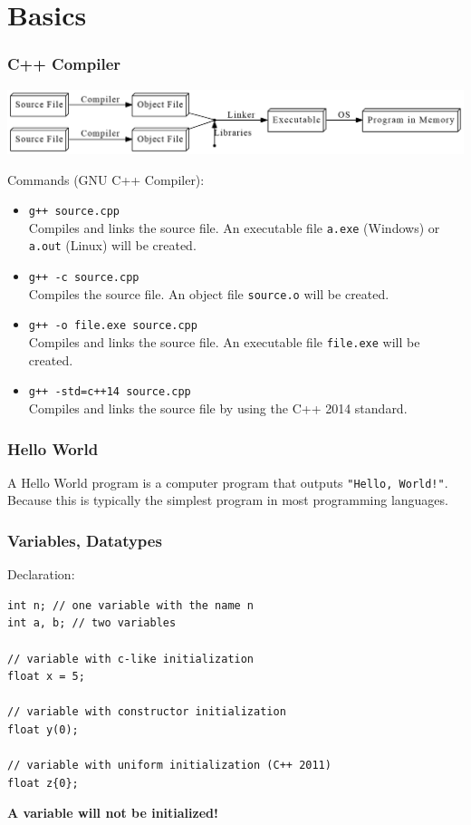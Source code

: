 \section{Basics}

\begin{frame}[fragile]
  \frametitle{C++ Compiler}
  \begin{center}
  \includegraphics[scale=0.35]{img/compiler.png}
  \end{center}
  \vspace{1mm}
  Commands (GNU C++ Compiler):
  \begin{itemize}
  \item \verb|g++ source.cpp|\\
  {\tiny Compiles and links the source file. An executable file \verb|a.exe| (Windows) or \verb|a.out|
  (Linux) will be created.}
  \item \verb|g++ -c source.cpp|\\
  {\tiny Compiles the source file. An object file \verb|source.o| will be created.}
  \item \verb|g++ -o file.exe source.cpp|\\
  {\tiny Compiles and links the source file. An executable file \verb|file.exe| will be created.}
  \item \verb|g++ -std=c++14 source.cpp|\\
  {\tiny Compiles and links the source file by using the C++ 2014 standard.}
  \end{itemize}
\end{frame}

\begin{frame}[fragile]
  \frametitle{Hello World}
  A Hello World program is a computer program that outputs \verb|"Hello, World!"|. Because this is
  typically the simplest program in most programming languages.
  {\tiny
  
  }
\end{frame}

\begin{frame}[fragile]
  \frametitle{Variables, Datatypes}
  Declaration:
  {\small
\begin{lstlisting}
int n; // one variable with the name n
int a, b; // two variables

// variable with c-like initialization
float x = 5;

// variable with constructor initialization
float y(0);

// variable with uniform initialization (C++ 2011)
float z{0};
\end{lstlisting}
  }
  {\bf A variable will not be initialized!}
\end{frame}

